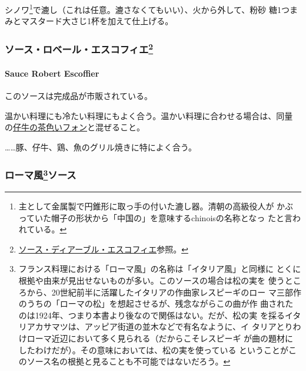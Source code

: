 \begin{recette}
シノワ\footnote{主として金属製で円錐形に取っ手の付いた漉し器。清朝の高級役人が
  かぶっていた帽子の形状から「中国の」を意味するchinoisの名称となっ
  たと言われている。}で漉し（これは任意。漉さなくてもいい）、火から外して、粉砂
糖1つまみとマスタード大さじ1杯を加えて仕上げる。

\maeaki

\hypertarget{ux30bdux30fcux30b9ux30edux30d9ux30fcux30ebux30a8ux30b9ux30b3ux30d5ux30a3ux30a879}{%
\subsubsection[ソース・ロベール・エスコフィエ]{\texorpdfstring{ソース・ロベール・エスコフィエ\footnote{\protect\hyperlink{sauce-diable-escoffier}{ソース・ディアーブル・エスコフィエ}参照。}}{ソース・ロベール・エスコフィエ}}\label{ux30bdux30fcux30b9ux30edux30d9ux30fcux30ebux30a8ux30b9ux30b3ux30d5ux30a3ux30a879}}

\hypertarget{sauce-robert-escoffier}{%
\paragraph{Sauce Robert Escoffier}\label{sauce-robert-escoffier}}

 

このソースは完成品が市販されている。

温かい料理にも冷たい料理にもよく合う。温かい料理に合わせる場合は、同量
の\protect\hyperlink{fonds-de-veau-brun}{仔牛の茶色いフォン}と混ぜること。

\ldots{}\ldots{}豚、仔牛、鶏、魚のグリル焼きに特によく合う。

\maeaki

\hypertarget{ux30edux30fcux30deux98a880ux30bdux30fcux30b9}{%
\subsubsection[ローマ風ソース]{\texorpdfstring{ローマ風\footnote{フランス料理における「ローマ風」の名称は「イタリア風」と同様に
  とくに根拠や由来が見出せないものが多い。このソースの場合は松の実を
  使うところから、20世紀前半に活躍したイタリアの作曲家レスピーギのロー
  マ三部作のうちの「ローマの松」を想起させるが、残念ながらこの曲が作
  曲されたのは1924年、つまり本書より後なので関係はない。だが、松の実
  を採るイタリアカサマツは、アッピア街道の並木などで有名なように、イ
  タリアとりわけローマ近辺において多く見られる（だからこそレスピーギ
  が曲の題材にしたわけだが）。その意味においては、松の実を使っている
  ということがこのソース名の根拠と見ることも不可能ではないだろう。}ソース}{ローマ風ソース}}\label{ux30edux30fcux30deux98a880ux30bdux30fcux30b9}}


\end{recette}
